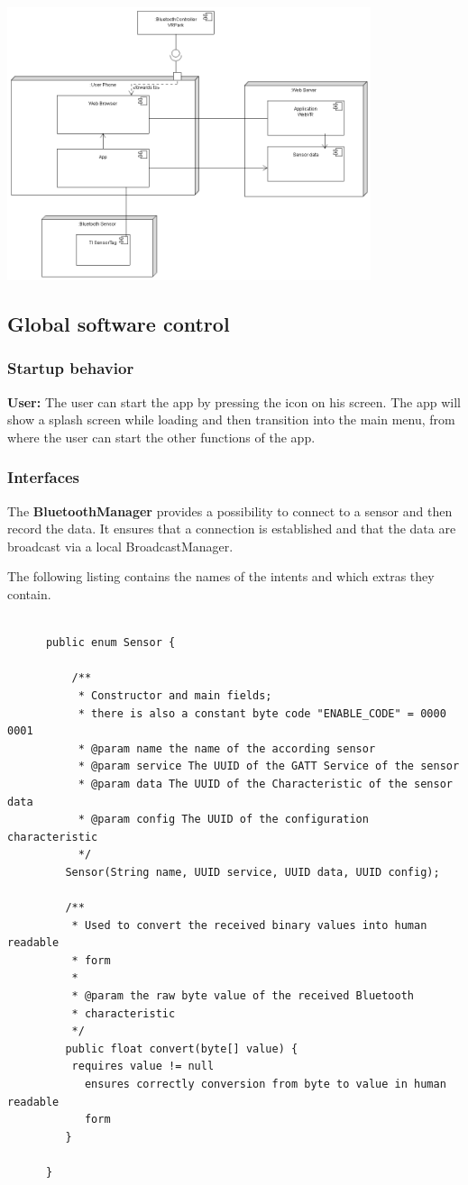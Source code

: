 \includegraphics[width=0.8\textwidth]{diagramms/hsMapping.png}


\subsection{Global software control}
\subsubsection{Startup behavior}
\textbf{User:} The user can start the app by pressing the icon on his screen.
The app will show a splash screen while loading and then transition into the main menu, from where the user can start the other functions of the app.

\subsubsection{Interfaces}
    The \textbf{BluetoothManager} provides a possibility to connect to a sensor and then record the data. It ensures that a connection is established and that the data are broadcast via a local BroadcastManager. 
    
    The following listing contains the names of the intents and which extras they contain.
   \hspace{-2cm}  \begin{lstlisting}

      public enum Sensor {

          /**
           * Constructor and main fields;
           * there is also a constant byte code "ENABLE_CODE" = 0000 0001
           * @param name the name of the according sensor
           * @param service The UUID of the GATT Service of the sensor
           * @param data The UUID of the Characteristic of the sensor data
           * @param config The UUID of the configuration characteristic
           */
         Sensor(String name, UUID service, UUID data, UUID config);

         /**
          * Used to convert the received binary values into human readable 
          * form
          *
          * @param the raw byte value of the received Bluetooth 
          * characteristic
          */
         public float convert(byte[] value) {
          requires value != null
            ensures correctly conversion from byte to value in human readable
            form
         }

      }
    \end{lstlisting}
    

